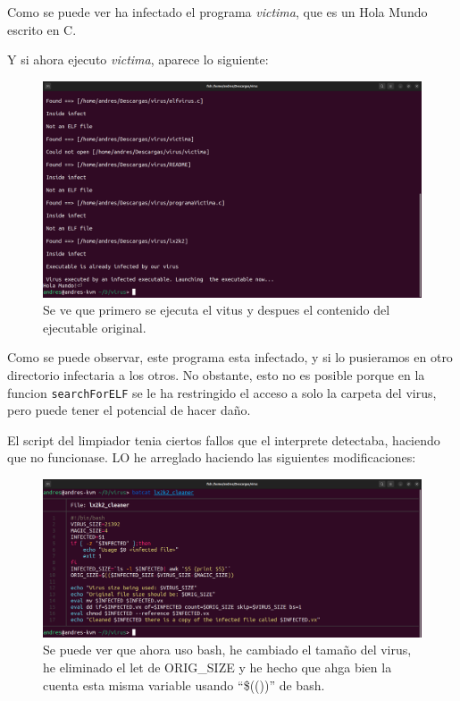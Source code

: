 \documentclass{article}
\begin{document}
Como se puede ver ha infectado el programa \textit{victima}, que es un Hola Mundo escrito en C.

Y si ahora ejecuto \textit{victima}, aparece lo siguiente:

\begin{figure}[H]
    \includegraphics[width=\textwidth]{imagenes/victimaInfectada/Captura desde 2022-11-23 12-33-29.png}
    \caption{Se ve que primero se ejecuta el vitus y despues el contenido del ejecutable original.}
\end{figure}

Como se puede observar, este programa esta infectado, y si lo pusieramos en otro directorio infectaria a los otros. No obstante, esto no es posible porque en la funcion \verb|searchForELF| se le ha restringido el acceso a solo la carpeta del virus, pero puede tener el potencial de hacer daño.



El script del limpiador tenia ciertos fallos que el interprete detectaba, haciendo que no funcionase. LO he arreglado haciendo las siguientes modificaciones: 

\begin{figure}[H]
    \includegraphics[width=\textwidth]{imagenes/Captura desde 2022-11-23 12-44-29.png}
    \caption{Se puede ver que ahora uso bash, he cambiado el tamaño del virus, he eliminado el let de ORIG\_SIZE y he hecho que ahga bien la cuenta esta misma variable usando ``\$(())'' de bash.}
\end{figure}
\end{document}
